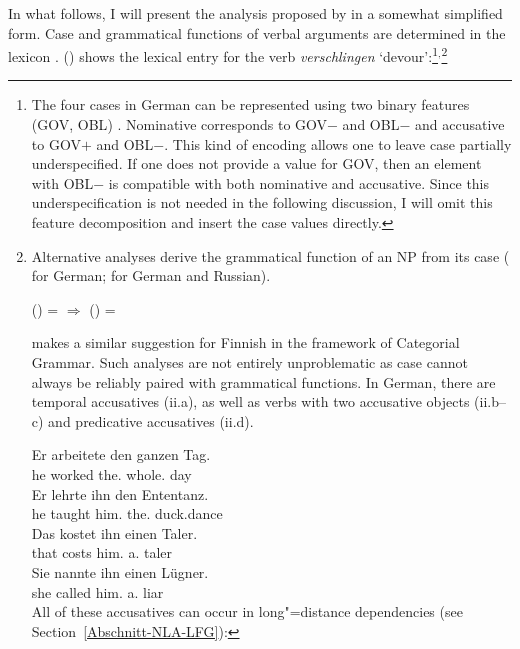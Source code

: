 {In what follows, I will present the analysis proposed by  \citet[Section~2.1.3]{Berman96a-u} in a
somewhat simplified form. Case and grammatical functions of verbal arguments are determined
in the lexicon \citep[]{Berman96a-u}. () shows the lexical entry for the verb \emph{verschlingen} `devour':\footnote{%
The four cases in German can be represented using two binary features ({\small GOV}, {\small OBL}) \citep[]{Berman96a-u}. Nominative corresponds to {\small GOV}$-$ and
  {\small OBL}$-$ and accusative to {\small GOV}$+$ and {\small OBL}$-$. This kind of encoding allows one to leave case partially underspecified. If one does not provide a value
  for {\small GOV}, then an element with {\small OBL}$-$  is compatible with both nominative and accusative. Since this underspecification is not needed in the following discussion,
  I will omit this feature decomposition and insert the case values directly.
}$^,$\footnote{%
	Alternative analyses derive the grammatical function of an NP from its case (\citealp[]{Berman2003a} for German; \citealp[, ]{Bresnan2001a} for German and Russian).

\ea
\label{Kasus-Implikation-Berman}
\upshape      (\downsp \case) = \mdacc{} $\Rightarrow$ (\upsp \lfgobj) = \down{}
\z

\noindent
  \citet[Section~2.1]{Karttunen89a-u} makes a similar suggestion for Finnish in the framework of Categorial Grammar\indexcxg.
  Such analyses are not entirely unproblematic as case cannot always be reliably paired with
  grammatical functions. In German, there are temporal accusatives (ii.a), as well as verbs with two accusative objects (ii.b--c) and predicative accusatives (ii.d).

\eal
\ex 
\gll Er arbeitete den ganzen Tag.\\
	 he worked the.\acc{} whole.\acc{} day\\
\ex 
\gll Er lehrte ihn den Ententanz.\\
	 he taught him.\acc{} the.\acc{} duck.dance\\
\ex 
\gll Das kostet ihn einen Taler.\\
	 that costs him.\acc{} a.\acc{} taler\\
\ex 
\gll Sie nannte ihn einen Lügner.\\
	 she called him.\acc{} a.\acc{} liar\\
\zl
All of these accusatives can occur in long"=distance dependencies (see Section~\ref{Abschnitt-NLA-LFG}):

}}
